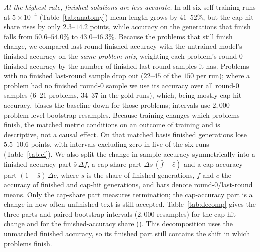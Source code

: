 \documentclass[runningheads]{llncs}
\begin{document}
\emph{At the highest rate, finished solutions are less accurate.} In all six
self-training runs at $5\times10^{-4}$ (Table~\ref{tab:anatomy}) mean length grows
by $41$--$52\%$, but the cap-hit share rises by only $2.3$--$14.2$ points, while
accuracy on the generations that finish falls from $50.6$--$54.0\%$ to
$43.0$--$46.3\%$. Because the problems that still finish change, we compared
last-round finished accuracy with the untrained model's finished accuracy on the
\emph{same problem mix}, weighting each problem's round-0 finished accuracy by
the number of finished last-round samples it has. Problems with no finished
last-round sample drop out ($22$--$45$ of the $150$ per run); where a problem had
no finished round-0 sample we use its accuracy over all round-0 samples
($6$--$21$ problems, $34$--$37$ in the gold runs), which, being mostly cap-hit
accuracy, biases the baseline down for those problems; intervals use $2{,}000$
problem-level bootstrap resamples. Because training changes which problems
finish, the matched metric conditions on an outcome of training and is
descriptive, not a causal effect. On that matched basis finished
generations lose $5.5$--$10.6$ points, with intervals excluding zero in five of
the six runs (Table~\ref{tab:ci}). We also split the change in sample accuracy
symmetrically into a finished-accuracy part
$\bar s\,\Delta f$, a cap-share part $\Delta s\,(\bar f-\bar c)$ and a
cap-accuracy part $(1-\bar s)\,\Delta c$, where $s$ is the share of finished
generations, $f$ and $c$ the accuracy of finished and cap-hit generations, and
bars denote round-0/last-round means. Only the cap-share part measures
termination; the cap-accuracy part is a change in how often unfinished text is
still accepted. Table~\ref{tab:decomp} gives the three parts and paired
bootstrap intervals ($2{,}000$ resamples) for the cap-hit change and for the
finished-accuracy share ().
This decomposition uses the unmatched finished accuracy, so its finished part
still contains the shift in which problems finish.
\end{document}
